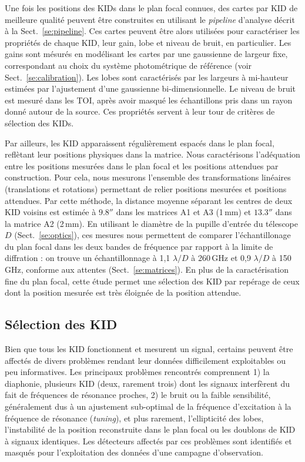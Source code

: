 Une fois les positions des KIDs dans le plan focal connues, des cartes
par KID de meilleure qualité peuvent être construites en utilisant le
\emph{pipeline} d'analyse décrit à la Sect.~\ref{se:pipeline}. Ces
cartes peuvent être alors utilisées pour caractériser les propriétés
de chaque KID, leur gain, lobe et niveau de bruit, en particulier. Les
gains sont mésurés en modélisant les cartes par une gaussienne de
largeur fixe, correspondant au choix du système photométrique de
référence (voir Sect.~\ref{se:calibration}). Les lobes sont
caractérisés par les largeurs à mi-hauteur estimées par l'ajustement
d'une gaussienne bi-dimensionnelle. Le niveau de bruit est mesuré dans
les TOI, après avoir masqué les échantillons pris dans un rayon donné
autour de la source. Ces propriétés servent à leur tour de critères de
sélection des KIDs.

Par ailleurs, les KID apparaissent régulièrement espacés dans le plan
focal, reflètant leur positions physiques dans la matrice. Nous
caractérisons l'adéquation entre les positions mesurées dans le plan
focal et les positions attendues par construction. Pour cela, nous
mesurons l'ensemble des transformations linéaires (translations et
rotations) permettant de relier positions mesurées et positions
attendues. Par cette méthode, la distance moyenne séparant les centres
de deux KID voisins est estimée à $9.8''$ dans les matrices A1 et A3
(1\,mm) et $13.3''$ dans la matrice A2 (2\,mm). En utilisant le
diamètre de la pupille d'entrée du télescope $D$ (Sect.~\ref{se:optics}),
ces mesures nous permettent de comparer l'échantillonage du plan focal
dans les deux bandes de fréquence par rapport à la limite de
diffration : on trouve un échantillonnage à 1,1 $\lambda/D$ à
260\,GHz et 0,9 $\lambda/D$ à 150\,GHz, conforme aux attentes
(Sect.~\ref{se:matrices}). En plus de la caractérisation fine du plan
focal, cette étude permet une sélection des KID par repérage de ceux
dont la position mesurée est très éloignée de la position attendue.   


\subsection{Sélection des KID}
\label{se:KID_selection}

Bien que tous les KID fonctionnent et mesurent un signal, certains peuvent
être affectés de divers problèmes rendant leur données difficilement
exploitables ou peu informatives. Les principaux problèmes rencontrés
comprennent 1) la diaphonie, plusieurs KID (deux, rarement trois) dont
les signaux interfèrent du fait de fréquences de résonance proches, 2)
le bruit ou la faible sensibilité, généralement dus à un ajustement
sub-optimal de la fréquence d'excitation à la fréquence de résonance
(\emph{tuning}), et plus rarement, l'ellipticité des lobes,
l'instabilité de la position reconstruite dans le plan focal ou les
doublons de KID à signaux identiques. Les détecteurs affectés par ces
problèmes sont identifiés et masqués pour l'exploitation des données
d'une campagne d'observation.

